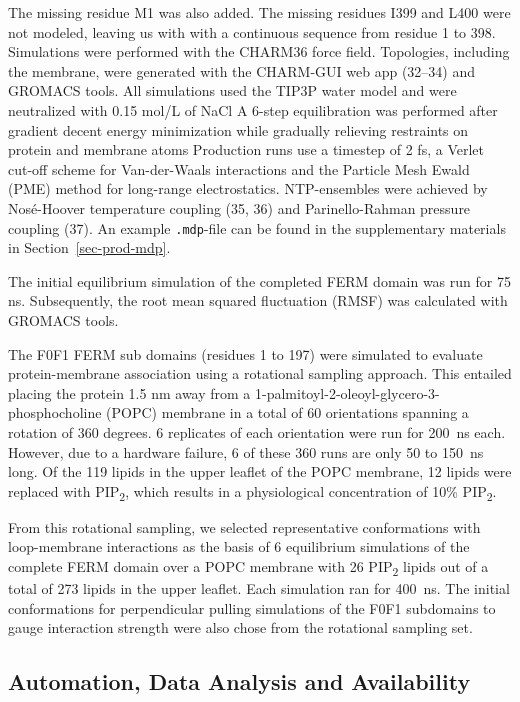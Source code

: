 \documentclass[
  twocolumn]{biophys-new-mod}
\begin{document}
The missing residue M1 was also added. The missing residues I399 and
L400 were not modeled, leaving us with with a continuous sequence from
residue 1 to 398. Simulations were performed with the CHARM36 force
field. Topologies, including the membrane, were generated with the
CHARM-GUI web app (32--34) and GROMACS tools. All simulations used the
TIP3P water model and were neutralized with 0.15 mol/L of NaCl A 6-step
equilibration was performed after gradient decent energy minimization
while gradually relieving restraints on protein and membrane atoms
Production runs use a timestep of 2 fs, a Verlet cut-off scheme for
Van-der-Waals interactions and the Particle Mesh Ewald (PME) method for
long-range electrostatics. NTP-ensembles were achieved by Nosé-Hoover
temperature coupling (35, 36) and Parinello-Rahman pressure coupling
(37). An example \texttt{.mdp}-file can be found in the supplementary
materials in Section~\ref{sec-prod-mdp}.

The initial equilibrium simulation of the completed FERM domain was run
for 75 ns. Subsequently, the root mean squared fluctuation (RMSF) was
calculated with GROMACS tools.

The F0F1 FERM sub domains (residues 1 to 197) were simulated to evaluate
protein-membrane association using a rotational sampling approach. This
entailed placing the protein 1.5 nm away from a
1-palmitoyl-2-oleoyl-glycero-3-phosphocholine (POPC) membrane in a total
of 60 orientations spanning a rotation of 360 degrees. 6 replicates of
each orientation were run for 200~ns each. However, due to a hardware
failure, 6 of these 360 runs are only 50 to 150~ns long. Of the 119
lipids in the upper leaflet of the POPC membrane, 12 lipids were
replaced with PIP\textsubscript{2}, which results in a physiological
concentration of 10\% PIP\textsubscript{2}.

From this rotational sampling, we selected representative conformations
with loop-membrane interactions as the basis of 6 equilibrium
simulations of the complete FERM domain over a POPC membrane with 26
PIP\textsubscript{2} lipids out of a total of 273 lipids in the upper
leaflet. Each simulation ran for 400~ns. The initial conformations for
perpendicular pulling simulations of the F0F1 subdomains to gauge
interaction strength were also chose from the rotational sampling set.

\hypertarget{automation-data-analysis-and-availability}{%
\subsection{Automation, Data Analysis and
Availability}\label{automation-data-analysis-and-availability}}
\end{document}
